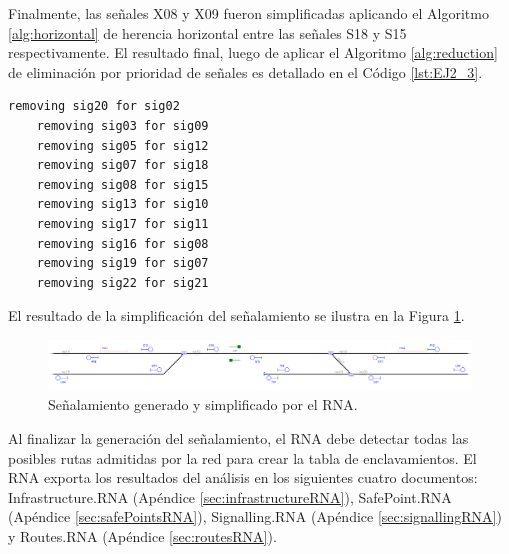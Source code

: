 	Finalmente, las señales X08 y X09 fueron simplificadas aplicando el Algoritmo \ref{alg:horizontal} de herencia horizontal entre las señales S18 y S15 respectivamente. El resultado final, luego de aplicar el Algoritmo \ref{alg:reduction} de eliminación por prioridad de señales es detallado en el Código \ref{lst:EJ2_3}.

	\begin{lstlisting}[language = {}, caption = Reducción de señalamiento por prioridad de señales, label = {lst:EJ2_3}]
	removing sig20 for sig02
	removing sig03 for sig09
	removing sig05 for sig12
	removing sig07 for sig18
	removing sig08 for sig15
	removing sig13 for sig10
	removing sig17 for sig11
	removing sig16 for sig08
	removing sig19 for sig07
	removing sig22 for sig21
	\end{lstlisting}

	El resultado de la simplificación del señalamiento se ilustra en la Figura \ref{fig:EJ2_7}.

	 \begin{figure}[H]
		\centering
		\includegraphics[width=1\textwidth]{resultados-obtenidos/ejemplo2/images/2_RNA.png}
		\centering\caption{Señalamiento generado y simplificado por el RNA.}
		\label{fig:EJ2_7}
	\end{figure}
	
	Al finalizar la generación del señalamiento, el RNA debe detectar todas las posibles rutas admitidas por la red para crear la tabla de enclavamientos. El RNA exporta los resultados del análisis en los siguientes cuatro documentos: Infrastructure.RNA (Apéndice \ref{sec:infrastructureRNA}), SafePoint.RNA (Apéndice \ref{sec:safePointsRNA}), Signalling.RNA (Apéndice \ref{sec:signallingRNA}) y Routes.RNA (Apéndice \ref{sec:routesRNA}).